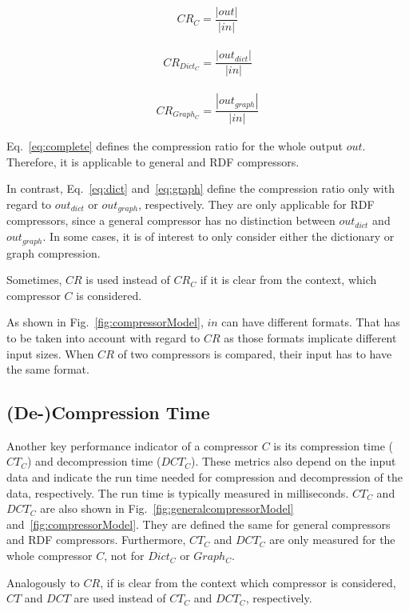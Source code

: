\begin{align}
CR_{C} = \dfrac{|out|}{ |in|} \label{eq:complete}
\end{align}

\begin{align}
CR_{Dict_C} = \dfrac{|out_{dict}|}{ |in|} \label{eq:dict}
\end{align}

\begin{align}
CR_{Graph_C} = \dfrac{|out_{graph}|}{ |in|} \label{eq:graph}
\end{align}

Eq.~\ref{eq:complete} defines the compression ratio for the whole output $out$. Therefore, it is applicable to general and RDF compressors.

In contrast, Eq.~\ref{eq:dict} and~\ref{eq:graph} define the compression ratio only with regard to $out_{dict}$ or $out_{graph}$, respectively. They are only applicable for RDF compressors, since a general compressor has no distinction between $out_{dict}$ and $out_{graph}$. In some cases, it is of interest to only consider either the dictionary or graph compression.

Sometimes, $CR$ is used instead of $CR_C$ if it is clear from the context, which compressor $C$ is considered.

As shown in Fig.~\ref{fig:compressorModel}, $in$ can have different formats. That has to be taken into account with regard to $CR$ as those formats implicate different input sizes. When $CR$ of two compressors is compared, their input has to have the same format.

\subsection{(De-)Compression Time}\label{sec:approachComprTime}

Another key performance indicator of a compressor $C$ is its compression time ($CT_C$) and decompression time ($DCT_C$). These metrics also depend on the input data and indicate the run time needed for compression and decompression of the data, respectively. The run time is typically measured in milliseconds. $CT_C$ and $DCT_C$ are also shown in Fig.~\ref{fig:generalcompressorModel} and~\ref{fig:compressorModel}. They are defined the same for general compressors and RDF compressors. Furthermore, $CT_C$ and $DCT_C$ are only measured for the whole compressor $C$, not for $Dict_C$ or $Graph_C$.

Analogously to $CR$, if is clear from the context which compressor is considered, $CT$ and $DCT$ are used instead of $CT_C$ and $DCT_C$, respectively.


